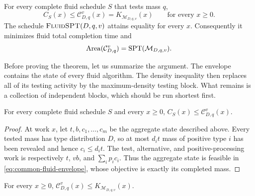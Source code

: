 \begin{theorem}
\label{lem:test-module-envelope}
For every complete fluid schedule $S$ that tests mass $q$,
\begin{equation}
 C_S(x)\le \mathcal C^v_{D,q}(x)
 =K_{\mathcal M_{D,q,v}}(x)
 \qquad\text{for every }x\ge0.
 \label{eq:fluid-pointwise-optimality}
\end{equation}
The schedule $\textnormal{\textsc{FluidSPT}}(D,q,v)$ attains equality for
every $x$.  Consequently it minimizes fluid total completion time and
\begin{equation}
 \operatorname{Area}(\mathcal C^v_{D,q})=\operatorname{SPT}(\mathcal M_{D,q,v}).
 \label{eq:common-envelope-area}
\end{equation}
\end{theorem}

Before proving the theorem, let us summarize the argument.  The envelope
contains the state of every fluid algorithm.  The density inequality then
replaces all of its testing activity by the maximum-density testing block.
What remains is a collection of independent blocks, which should be run
shortest first.

\begin{claim}
\label{clm:fluid-envelope-upper}
For every complete fluid schedule $S$ and every $x\ge0$,
$C_S(x)\le\mathcal C^v_{D,q}(x)$.
\end{claim}

\begin{proof}
At work $x$, let $t,b,c_1,\ldots,c_m$ be the aggregate state described
above.  Every tested mass has type distribution $D$, so at most $d_it$ mass
of positive type $i$ has been revealed and hence $c_i\le d_it$.  The test,
alternative, and positive-processing work is respectively
$t$, $vb$, and $\sum_i p_ic_i$.  Thus the aggregate state is feasible in
\cref{eq:common-fluid-envelope}, whose objective is exactly its completed
mass.
\end{proof}

\begin{claim}
\label{clm:fluid-compression}
For every $x\ge0$,
$\mathcal C^v_{D,q}(x)\le K_{\mathcal M_{D,q,v}}(x)$.
\end{claim}


